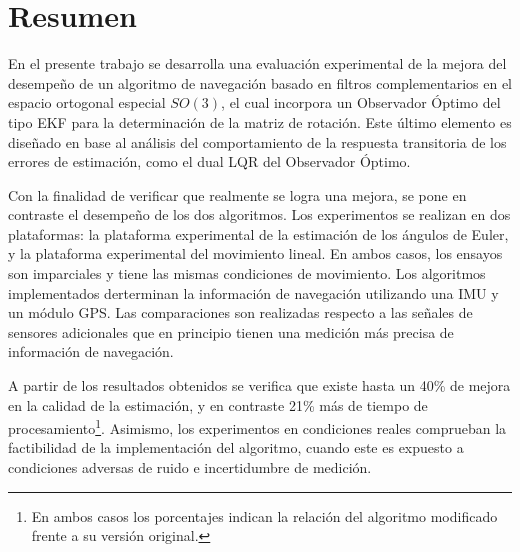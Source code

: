\documentclass[10pt]{report}
\numberwithin{equation}{chapter}
\numberwithin{algorithm}{chapter}
\begin{document}
\chapter*{Resumen}
En el presente trabajo se desarrolla una evaluación experimental de la mejora del desempeño de un algoritmo de navegación basado en filtros complementarios en el espacio ortogonal especial $SO(3)$, el cual incorpora un Observador Óptimo del tipo EKF para la determinación de la matriz de rotación. Este último elemento es diseñado en base al análisis del comportamiento de la respuesta transitoria de los errores de estimación, como el dual LQR del Observador Óptimo. \par
Con la finalidad de verificar que realmente se logra una mejora, se pone en contraste el desempeño de los dos algoritmos. Los experimentos se realizan en dos plataformas: la plataforma experimental de la estimación de los ángulos de Euler, y la plataforma experimental del movimiento lineal. En ambos casos, los ensayos son imparciales y tiene las mismas condiciones de movimiento. Los algoritmos  implementados derterminan la información de navegación utilizando una IMU y un módulo GPS. Las comparaciones son realizadas respecto a las señales de sensores adicionales que en principio tienen una medición más precisa de información de navegación.\par
A partir de los resultados obtenidos se verifica que existe hasta un 40\% de mejora en la calidad de la estimación, y en contraste 21\% más de tiempo de procesamiento\footnote{En ambos casos los porcentajes indican la relación del algoritmo modificado frente a su versión original.}. Asimismo, los experimentos en condiciones reales comprueban la factibilidad de la implementación del algoritmo, cuando este es expuesto a condiciones adversas de ruido e incertidumbre de medición.\normalsize
\thispagestyle{empty}
\setcounter{page}{1}
\newpage
{}
\tableofcontents
\cleardoublepage
\listoffigures %
\cleardoublepage
\listoftables %
\newpage
{}
\setcounter{page}{1}
\end{document}
